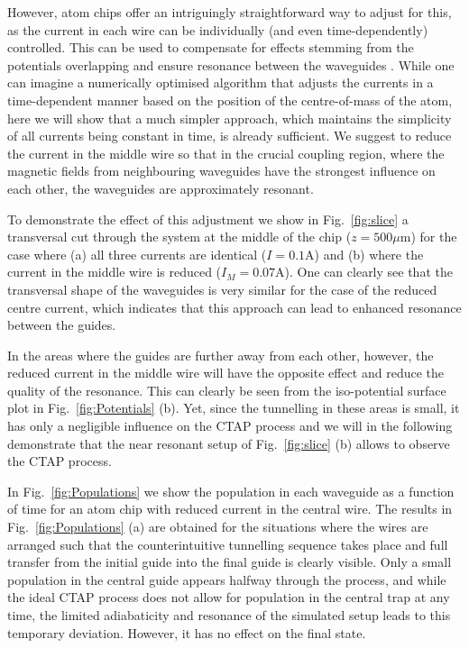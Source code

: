 However, atom chips offer an intriguingly straightforward way to adjust for this, as the current in each wire can be individually (and even time-dependently) controlled. This can be used to compensate for effects stemming from the potentials overlapping and ensure resonance between the waveguides \cite{OSullivan:10}. While one can imagine a numerically optimised algorithm that adjusts the currents in a time-dependent manner based on the position of the centre-of-mass of the atom, here we will show that a much simpler approach, which maintains the simplicity of all currents being constant in time, is already sufficient. We suggest to reduce the current in the middle wire so that in the crucial coupling region, where the magnetic fields from neighbouring waveguides have the strongest influence on each other, the waveguides are approximately resonant.

To demonstrate the effect of this adjustment we show in Fig.~\ref{fig:slice} a transversal cut through the system at the middle of the chip ($z=500 \mu$m) for the case where (a) all three currents are identical ($I=0.1$A) and (b) where the current in the middle wire is reduced ($I_M=0.07$A). One can clearly see that the transversal shape of the waveguides is very similar for the case of the reduced centre current, which indicates that this approach can lead to enhanced resonance between the guides.

In the areas where the guides are further away from each other, however, the reduced current in the middle wire will have the opposite effect and reduce the quality of the resonance. This can clearly be seen from the iso-potential surface plot in Fig.~\ref{fig:Potentials} (b). Yet, since the tunnelling in these areas is small, it has only a negligible influence on the CTAP process and we will in the following demonstrate that the near resonant setup of Fig.~\ref{fig:slice} (b) allows to observe the CTAP process.

In Fig.~\ref{fig:Populations} we show the population in each waveguide as a function of time for an atom chip with reduced current in the central wire. The results in Fig.~\ref{fig:Populations} (a) are obtained for the situations where the wires are arranged such that the counterintuitive tunnelling sequence takes place and full transfer from the initial guide into the final guide is clearly visible. Only a small population in the central guide appears halfway through the process, and while the ideal CTAP process does not allow for population in the central trap at any time, the limited adiabaticity and resonance of the simulated setup leads to this temporary deviation. However, it has no effect on the final state.

